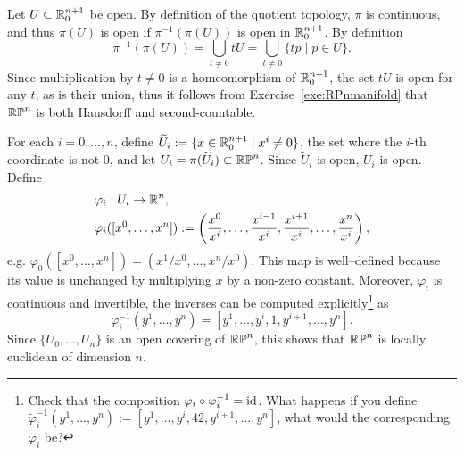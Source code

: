 \begin{example}
	Let $U\subset\mathbb{R}_0^{n+1}$ be open. By definition of the quotient topology, $\pi$ is continuous, and thus $\pi(U)$ is open if $\pi^{-1}(\pi(U))$ is open in $\mathbb{R}^{n+1}_0$.
	By definition
	\begin{equation}
		\pi^{-1}(\pi(U)) = \bigcup_{t\neq 0} tU = \bigcup_{t\neq 0}\{tp \mid p\in U\}.
	\end{equation}
	Since multiplication by $t\neq 0$ is a homeomorphism of $\mathbb{R}_0^{n+1}$, the set $t U$ is open for any $t$, as is their union, thus it follows from Exercise~\ref{exe:RPnmanifold} that $\mathbb{RP}^n$ is both Hausdorff and second-countable.

	For each $i=0,\ldots,n$, define $\widetilde U_i := \{x\in\mathbb{R}^{n+1}_0 \mid x^i\neq0\}$, the set where the $i$-th coordinate is not $0$, and let $U_i = \pi(\widetilde U_i)\subset \mathbb{RP}^n$.
	Since $\widetilde U_i$ is open, $U_i$ is open.
	Define
	\begin{align}
		 & \varphi_i:U_i\to\mathbb{R}^n,                                                                                                               \\
		 & \varphi_i([x^0, \ldots, x^n]):= \left(\frac{x^0}{x^i},\ldots,\frac{x^{i-1}}{x^i},\frac{x^{i+1}}{x^i},\ldots,\frac{x^n}{x^i}\right),
	\end{align}
	e.g. $\varphi_0([x^0, \ldots, x^n]) = (x^1/x^0, \ldots, x^n/x^0)$.
	This map is well--defined because its value is unchanged by multiplying $x$ by a non-zero constant.
	Moreover, $\varphi_i$ is continuous and invertible, the inverses can be computed explicitly\footnote{Check that the composition $\varphi_i \circ \varphi_i^{-1} = \operatorname{id}$. What happens if you define $\widetilde\varphi^{-1}_i(y^1, \ldots, y^n) := \left[y^1, \ldots, y^{i}, 42, y^{i+1}, \ldots, y^n\right]$, what would the corresponding $\widetilde\varphi_i$ be?} as
	\begin{equation}
		\varphi_i^{-1}(y^1,\ldots,y^n) = \left[y^1, \ldots, y^{i}, 1, y^{i+1}, \ldots, y^n\right].
	\end{equation}
	Since $\{U_0, \ldots, U_n\}$ is an open covering of $\mathbb{RP}^n$, this shows that $\mathbb{RP}^n$ is locally euclidean of dimension $n$.


\end{example}
